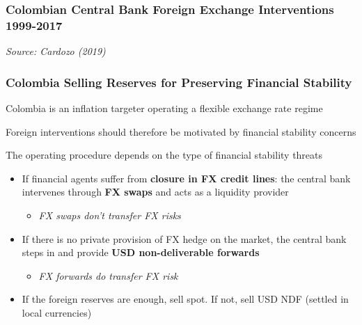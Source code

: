 \documentclass{beamer}
\newenvironment{wideitemize}{\itemize\addtolength{\itemsep}{10pt}}{\enditemize}
\begin{document}
\begin{frame}
\frametitle{Colombian Central Bank Foreign Exchange Interventions 1999-2017}
\medskip
\emph{Source: Cardozo (2019)}
\end{frame}


\begin{frame}
  \frametitle{Colombia Selling Reserves for Preserving Financial Stability}
  \begin{wideitemize}
    \item Colombia is an inflation targeter operating a flexible exchange rate regime
    \item Foreign interventions should therefore be motivated by financial stability concerns
    \item The operating procedure depends on the type of financial stability threats
      \begin{itemize}
      \item If financial agents suffer from \textbf{closure in FX credit lines}: the central bank intervenes through \textbf{FX swaps} and acts as a liquidity provider
        \begin{itemize}
        \item \emph{FX swaps don't transfer FX risks}
        \end{itemize}        
      \item If there is no private provision of FX hedge on the market, the central bank steps in and provide \textbf{USD non-deliverable forwards}
        \begin{itemize}
        \item \emph{FX forwards do transfer FX risk}
        \end{itemize}
      \item If the foreign reserves are enough, sell spot. If not, sell USD NDF (settled in local currencies) 
      \end{itemize}
  \end{wideitemize}
\end{frame}
\end{document}
